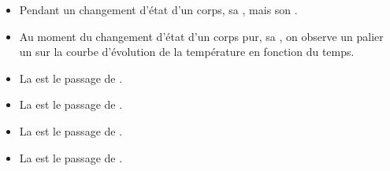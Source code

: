 \begin{mybilan}
	\begin{itemize}
		\item Pendant un changement d'état d'un corps, sa , mais son .
		\item Au moment du changement d'état d'un corps pur, sa , on observe un palier un  sur la courbe d'évolution de la température en fonction du temps.
		\item La  est le passage de .
		\item La  est le passage de .
		\item La  est le passage de .
		\item La  est le passage de .
		
	\end{itemize}


\end{mybilan}
